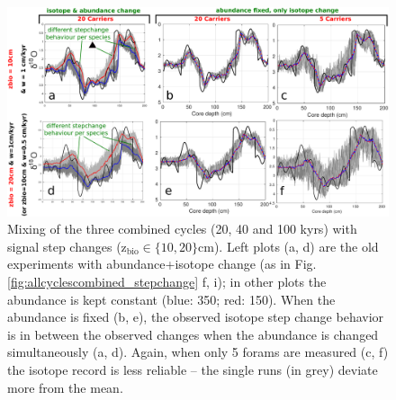 \documentclass[a4paper,oneside,9pt]{article}
\begin{document}
\begin{figure}[hbp]
\begin{center}
	\includegraphics[width=1.0\textwidth]{../figures/../figures/JustABU_3ycles_combined_gradual.pdf}
	\caption{Mixing of the three combined cycles (20, 40 and 100 kyrs) with signal step changes (z$_\mathrm{bio} \in \{10,20 \}$cm). 
	Left plots (a, d) are the old experiments with abundance+isotope change (as in Fig. \ref{fig:allcyclescombined_stepchange} f, i); 
	in other plots the abundance is kept constant (blue: 350; red: 150). 
	When the abundance is fixed (b, e), the observed isotope step change behavior is in between the observed changes when the abundance is changed simultaneously (a, d). 
	Again, when only 5 forams are measured (c, f) the isotope record is less reliable -- the single runs (in grey) deviate more from the mean.}\label{fig:xxxx5pointevent}
\end{center}
\end{figure}
\newpage

% 
\end{document}
